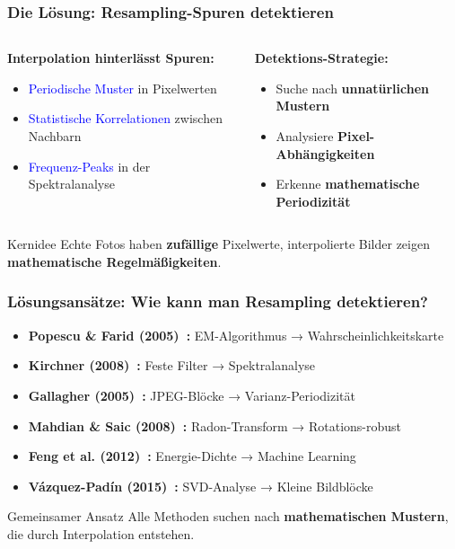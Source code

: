 \documentclass[11pt,t,usepdftitle=false,aspectratio=169]{beamer}
\begin{document}
\begin{frame}
	\frametitle{Die Lösung: Resampling-Spuren detektieren}
	\begin{columns}[T]
		\begin{column}{0.48\textwidth}
			\textbf{Interpolation hinterlässt Spuren:}
			\begin{itemize}
				\item \textcolor{blue}{Periodische Muster} in Pixelwerten
				\item \textcolor{blue}{Statistische Korrelationen} zwischen Nachbarn
				\item \textcolor{blue}{Frequenz-Peaks} in der Spektralanalyse
			\end{itemize}
		\end{column}
		\begin{column}{0.48\textwidth}
			\textbf{Detektions-Strategie:}
			\begin{itemize}
				\item Suche nach \textbf{unnatürlichen Mustern}
				\item Analysiere \textbf{Pixel-Abhängigkeiten}
				\item Erkenne \textbf{mathematische Periodizität}
			\end{itemize}
		\end{column}
	\end{columns}
	
	\vspace{1.5em}
	\begin{alertblock}{Kernidee}
		Echte Fotos haben \textbf{zufällige} Pixelwerte, interpolierte Bilder zeigen \textbf{mathematische Regelmäßigkeiten}.
	\end{alertblock}
\end{frame}

\begin{frame}
	\frametitle{Lösungsansätze: Wie kann man Resampling detektieren?}
	\begin{itemize}
		\item \textbf{Popescu \& Farid (2005)~\cite{popescu_exposing_2005}:} EM-Algorithmus → Wahrscheinlichkeitskarte
		\item \textbf{Kirchner (2008)~\cite{kirchner_fast_2008}:} Feste Filter → Spektralanalyse  
		\item \textbf{Gallagher (2005)~\cite{gallagher_detection_2005}:} JPEG-Blöcke → Varianz-Periodizität
		\item \textbf{Mahdian \& Saic (2008)~\cite{mahdian_blind_2008}:} Radon-Transform → Rotations-robust
		\item \textbf{Feng et al. (2012)~\cite{noauthor_pdf_2024}:} Energie-Dichte → Machine Learning
		\item \textbf{Vázquez-Padín (2015)~\cite{vazquez-padin_svd_2015}:} SVD-Analyse → Kleine Bildblöcke
	\end{itemize}
	
	\vspace{1.5em}
	\begin{alertblock}{Gemeinsamer Ansatz}
		Alle Methoden suchen nach \textbf{mathematischen Mustern}, die durch Interpolation entstehen.
	\end{alertblock}
\end{frame}
\end{document}
